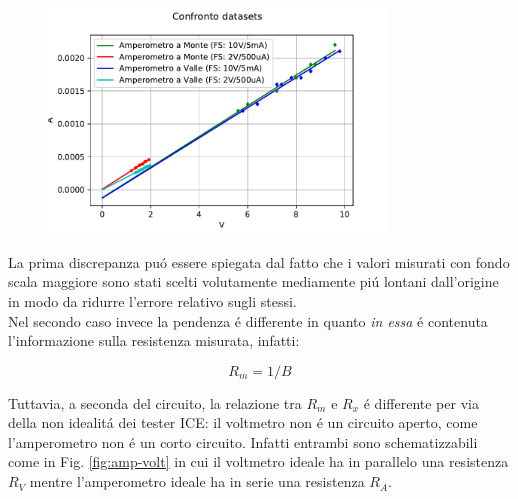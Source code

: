 \documentclass{article}
\begin{document}
\begin{figure}[ht]
	\centering
	\includegraphics[width=0.8\textwidth]{data/FigAll.pdf}
	\caption{\label{fig:confr}}
\end{figure}
\newpage
La prima discrepanza pu\'o essere spiegata dal fatto che i valori misurati con fondo scala maggiore sono stati scelti volutamente mediamente pi\'u lontani dall'origine in modo da ridurre l'errore relativo sugli stessi.\\
Nel secondo caso invece la pendenza \'e differente in quanto \textit{in essa} \'e contenuta l'informazione sulla resistenza misurata, infatti:

\begin{equation}
	R_m=1/B
\end{equation}

Tuttavia, a seconda del circuito, la relazione tra $R_m$ e $R_x$ \'e differente per via della non idealit\'a dei tester ICE: il voltmetro non \'e un circuito aperto, come l'amperometro non \'e un corto circuito. Infatti entrambi sono schematizzabili come in Fig. \ref{fig:amp-volt} in cui il voltmetro ideale ha in parallelo una resistenza $R_V$ mentre l'amperometro ideale ha in serie una resistenza $R_A$.
\end{document}

